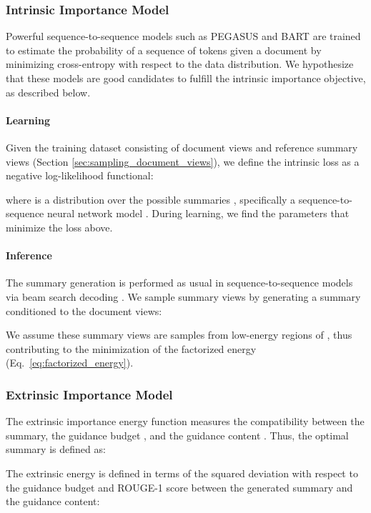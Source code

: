 \documentclass[11pt,table]{article}
\begin{document}
\subsubsection{Intrinsic Importance Model}
\label{sec:intrinsic_importance}
Powerful sequence-to-sequence models such as PEGASUS \citep{zhang2020pegasus} and BART \citep{lewis2019bart} are trained to estimate the probability of a sequence of tokens given a document by minimizing cross-entropy with respect to the data distribution. We hypothesize that these models are good candidates to fulfill the intrinsic importance objective, as described below.

\paragraph{Learning}
Given the training dataset  consisting of document views  and reference summary views  (Section \ref{sec:sampling_document_views}), we define the intrinsic loss as a negative log-likelihood functional:

where  is a distribution over the possible summaries , specifically a sequence-to-sequence neural network model \citep{lewis2019bart}. During learning, we find the parameters  that minimize the loss above.

\paragraph{Inference} 
The summary generation is performed as usual in sequence-to-sequence models via beam search decoding \citep{sutskever2014sequence}. We sample summary views by generating a summary conditioned to the document views:

We assume these summary views are samples from low-energy regions of , thus contributing to the minimization of the factorized energy (Eq.~\ref{eq:factorized_energy}).

\subsubsection{Extrinsic Importance Model}
\label{sec:extrinsic_importance}
The extrinsic importance energy function  measures the compatibility between the summary, the guidance budget , and the guidance content . Thus, the optimal summary  is defined as:

The extrinsic energy is defined in terms of the squared deviation with respect to the guidance budget and ROUGE-1 score between the generated summary and the guidance content:
\end{document}
